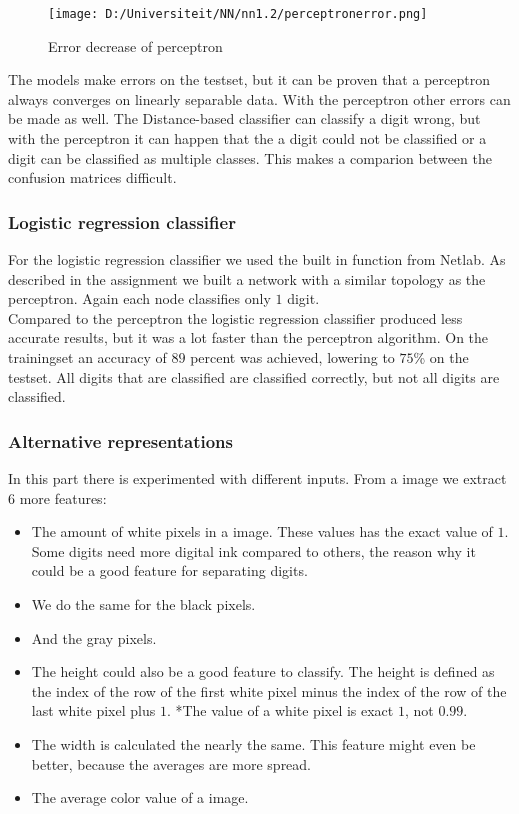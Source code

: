 \documentclass{article}
\begin{document}
\begin{figure}
	\centering
		\texttt{[image: D:/Universiteit/NN/nn1.2/perceptronerror.png]}
	\vspace{-0.2in}
	\caption{Error decrease of perceptron}
	\label{fig:perceptronerror}
\vspace{-1in}
\end{figure}

The models make errors on the testset, but it can be proven that a perceptron always converges on linearly separable data. With the perceptron other errors can be made as well. The Distance-based classifier can classify a digit wrong, but with the perceptron it can happen that the a digit could not be classified or a digit can be classified as multiple classes. This makes a comparion between the confusion matrices difficult. 

\subsubsection{Logistic regression classifier}
For the logistic regression classifier we used the built in function from Netlab. As described in the assignment we built a network with a similar topology as the perceptron. Again each node classifies only $1$ digit.\\
Compared to the perceptron the logistic regression classifier produced less accurate results, but it was a lot faster than the perceptron algorithm. On the trainingset an accuracy of $89$ percent was achieved, lowering to $75$\% on the testset. All digits that are classified are classified correctly, but not all digits are classified.

\subsubsection{Alternative representations}
In this part there is experimented with different inputs. From a image we extract $6$ more features:

\begin{itemize}
\item The amount of white pixels in a image. These values has the exact value of $1$. Some digits need more digital ink compared to others, the reason why it could be a good feature for separating digits.
\item We do the same for the black pixels.
\item And the gray pixels.
\item The height could also be a good feature to classify. The height is defined as the index of the row of the first white pixel minus the index of the row of the last white pixel plus $1$. *The value of a white pixel is exact $1$, not $0.99$. 
\item The width is calculated the nearly the same. This feature might even be better, because the averages are more spread.
\item The average color value of a image. 
\end{itemize}
\end{document}
